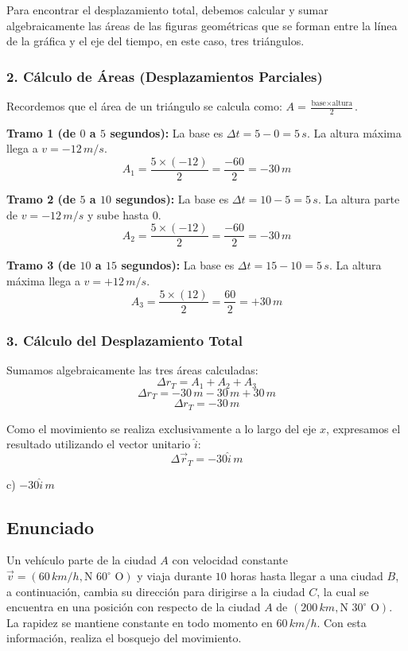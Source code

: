 \documentclass[12pt, a4paper]{article}
\begin{document}
Para encontrar el desplazamiento total, debemos calcular y sumar algebraicamente las áreas de las figuras geométricas que se forman entre la línea de la gráfica y el eje del tiempo, en este caso, tres triángulos.

\subsubsection*{2. Cálculo de Áreas (Desplazamientos Parciales)}
Recordemos que el área de un triángulo se calcula como: $A = \frac{\text{base} \times \text{altura}}{2}$.

\textbf{Tramo 1 (de $0$ a $5$ segundos):}
La base es $\Delta t = 5 - 0 = 5 \, \si{s}$. La altura máxima llega a $v = -12 \, \si{m/s}$.
$$ A_1 = \frac{5 \times (-12)}{2} = \frac{-60}{2} = -30 \, \si{m} $$

\textbf{Tramo 2 (de $5$ a $10$ segundos):}
La base es $\Delta t = 10 - 5 = 5 \, \si{s}$. La altura parte de $v = -12 \, \si{m/s}$ y sube hasta $0$.
$$ A_2 = \frac{5 \times (-12)}{2} = \frac{-60}{2} = -30 \, \si{m} $$

\textbf{Tramo 3 (de $10$ a $15$ segundos):}
La base es $\Delta t = 15 - 10 = 5 \, \si{s}$. La altura máxima llega a $v = +12 \, \si{m/s}$.
$$ A_3 = \frac{5 \times (12)}{2} = \frac{60}{2} = +30 \, \si{m} $$

\subsubsection*{3. Cálculo del Desplazamiento Total}
Sumamos algebraicamente las tres áreas calculadas:
$$ \Delta r_T = A_1 + A_2 + A_3 $$
$$ \Delta r_T = -30 \, \si{m} - 30 \, \si{m} + 30 \, \si{m} $$
$$ \Delta r_T = -30 \, \si{m} $$

Como el movimiento se realiza exclusivamente a lo largo del eje $x$, expresamos el resultado utilizando el vector unitario $\hat{i}$:
$$ \Delta\vec{r}_T = -30\hat{i} \, \si{m} $$

\begin{tcolorbox}[colback=green!5!white, colframe=green!50!black, title=Respuesta Final]
\centering \Large c) $-30\hat{i} \, \si{m}$
\end{tcolorbox}

\newpage

\subsection*{Enunciado}
Un vehículo parte de la ciudad $A$ con velocidad constante $\vec{v} = (60 \, \si{km/h}, \text{N } 60^\circ \text{ O})$ y viaja durante $10$ horas hasta llegar a una ciudad $B$, a continuación, cambia su dirección para dirigirse a la ciudad $C$, la cual se encuentra en una posición con respecto de la ciudad $A$ de $(200 \, \si{km}, \text{N } 30^\circ \text{ O})$. La rapidez se mantiene constante en todo momento en $60 \, \si{km/h}$. Con esta información, realiza el bosquejo del movimiento.
\end{document}
